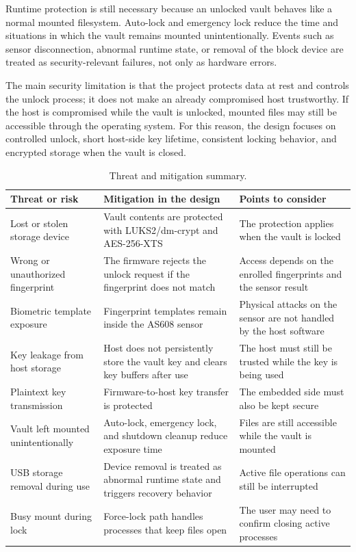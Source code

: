 Runtime protection is still necessary because an unlocked vault behaves like a normal mounted filesystem. Auto-lock and emergency lock reduce the time and situations in which the vault remains mounted unintentionally. Events such as sensor disconnection, abnormal runtime state, or removal of the block device are treated as security-relevant failures, not only as hardware errors.

The main security limitation is that the project protects data at rest and controls the unlock process; it does not make an already compromised host trustworthy. If the host is compromised while the vault is unlocked, mounted files may still be accessible through the operating system. For this reason, the design focuses on controlled unlock, short host-side key lifetime, consistent locking behavior, and encrypted storage when the vault is closed.

\begin{table}[!htbp]
\centering
\caption{\label{tab:threat-mitigation}Threat and mitigation summary.}
\small
\begin{tabularx}{\textwidth}{lXX}
\toprule
Threat or risk & Mitigation in the design & Points to consider\\
\midrule
Lost or stolen storage device & Vault contents are protected with LUKS2/dm-crypt and AES-256-XTS & The protection applies when the vault is locked\\
Wrong or unauthorized fingerprint & The firmware rejects the unlock request if the fingerprint does not match & Access depends on the enrolled fingerprints and the sensor result\\
Biometric template exposure & Fingerprint templates remain inside the AS608 sensor & Physical attacks on the sensor are not handled by the host software\\
Key leakage from host storage & Host does not persistently store the vault key and clears key buffers after use & The host must still be trusted while the key is being used\\
Plaintext key transmission & Firmware-to-host key transfer is protected & The embedded side must also be kept secure\\
Vault left mounted unintentionally & Auto-lock, emergency lock, and shutdown cleanup reduce exposure time & Files are still accessible while the vault is mounted\\
USB storage removal during use & Device removal is treated as abnormal runtime state and triggers recovery behavior & Active file operations can still be interrupted\\
Busy mount during lock & Force-lock path handles processes that keep files open & The user may need to confirm closing active processes\\
\bottomrule
\end{tabularx}
\end{table}

